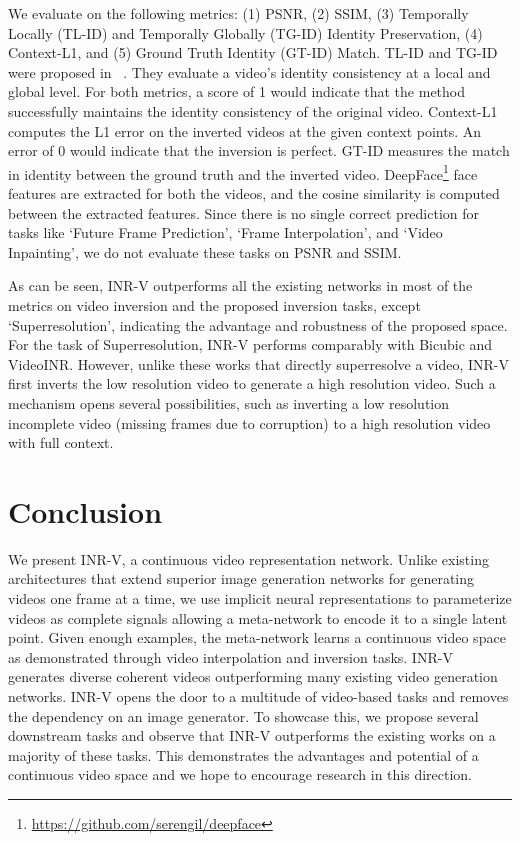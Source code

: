 \documentclass[10pt]{article} \usepackage[accepted]{tmlr}
\begin{document}
We evaluate on the following metrics: (1) PSNR, (2) SSIM, (3) Temporally Locally (TL-ID) and Temporally Globally (TG-ID) Identity Preservation, (4) Context-L1, and (5) Ground Truth Identity (GT-ID) Match. TL-ID and TG-ID were proposed in ~\cite{stit}. They evaluate a video's identity consistency at a local and global level. For both metrics, a score of 1 would indicate that the method successfully maintains the identity consistency of the original video. Context-L1 computes the L1 error on the inverted videos at the given context points. An error of $0$ would indicate that the inversion is perfect. GT-ID measures the match in identity between the ground truth and the inverted video. DeepFace\def\thefootnote{$^3$}\footnote{\href{https://github.com/serengil/deepface}{https://github.com/serengil/deepface}} face features are extracted for both the videos, and the cosine similarity is computed between the extracted features.
Since there is no single correct prediction for tasks like `Future Frame Prediction', `Frame Interpolation', and `Video Inpainting', we do not evaluate these tasks on PSNR and SSIM.

As can be seen, INR-V outperforms all the existing networks in most of the metrics on video inversion and the proposed inversion tasks, except `Superresolution', indicating the advantage and robustness of the proposed space. 
For the task of Superresolution, INR-V performs comparably with Bicubic and VideoINR. However, unlike these works that directly superresolve a video, INR-V first inverts the low resolution video to generate a high resolution video. 
Such a mechanism opens several possibilities, such as inverting a low resolution incomplete video (missing frames due to corruption) to a high resolution video with full context.

\section{Conclusion}
\label{conclusion_future_work}

We present INR-V, a continuous video representation network.
Unlike existing architectures that extend superior image generation networks for generating videos one frame at a time, we use implicit neural representations to parameterize videos as complete signals allowing a meta-network to encode it to a single latent point. Given enough examples, the meta-network learns a continuous video space as demonstrated through video interpolation and inversion tasks. INR-V generates diverse coherent videos outperforming many existing video generation networks.
INR-V opens the door to a multitude of video-based tasks and removes the dependency on an image generator. 
To showcase this, we propose several downstream tasks and observe that INR-V outperforms the existing works on a majority of these tasks. This demonstrates the advantages and potential of a continuous video space and we hope to encourage research in this direction. 
\end{document}

